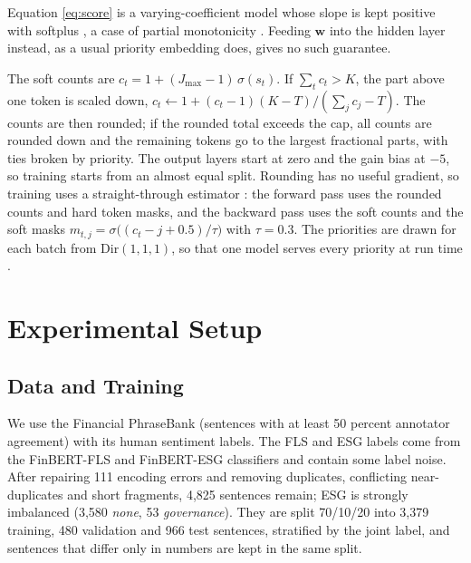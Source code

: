 \documentclass[conference]{IEEEtran}
\begin{document}
Equation \eqref{eq:score} is a varying-coefficient model
\cite{hastie1993varying} whose slope is kept positive with softplus
\cite{dugas2001softplus}, a case of partial monotonicity
\cite{daniels2010monotone}. Feeding $\mathbf{w}$ into the hidden layer
instead, as a usual priority embedding does, gives no such
guarantee.

The soft counts are $c_t = 1 + (J_{\max} - 1)\,\sigma(s_t)$. If
$\sum_t c_t > K$, the part above one token is scaled down,
$c_t \leftarrow 1 + (c_t - 1)(K - T)/(\sum_j c_j - T)$. The counts are
then rounded; if the rounded total exceeds the cap, all counts are
rounded down and the remaining tokens go to the largest fractional
parts, with ties broken by priority. The output layers start at zero
and the gain bias at $-5$, so training starts from an almost equal
split. Rounding has no useful gradient, so training uses a
straight-through estimator \cite{bengio2013estimating}: the forward
pass uses the rounded counts and hard token masks, and the backward
pass uses the soft counts and the soft masks
$m_{t,j} = \sigma\big((c_t - j + 0.5)/\tau\big)$ with $\tau = 0.3$. The
priorities are drawn for each batch from $\mathrm{Dir}(1,1,1)$, so that
one model serves every priority at run time
\cite{dosovitskiy2020yoto}.

\section{Experimental Setup}
\label{sec:setup}

\subsection{Data and Training}

We use the Financial PhraseBank \cite{malo2014phrasebank} (sentences
with at least 50 percent annotator agreement) with its human sentiment
labels. The FLS and ESG labels come from the FinBERT-FLS and
FinBERT-ESG classifiers \cite{huang2023finbert} and contain some label
noise. After repairing 111 encoding errors and removing duplicates,
conflicting near-duplicates and short fragments, 4,825 sentences
remain; ESG is strongly imbalanced (3,580 \emph{none}, 53
\emph{governance}). They are split 70/10/20 into 3,379 training, 480
validation and 966 test sentences, stratified by the joint label, and
sentences that differ only in numbers are kept in the same split.
\end{document}
